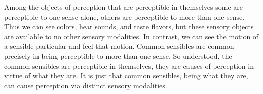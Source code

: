 Among the objects of perception that are perceptible in themselves some are perceptible to one sense alone, others are perceptible to more than one sense. Thus we can see colors, hear sounds, and taste flavors, but these sensory objects are available to no other sensory modalities. In contrast, we can see the motion of a sensible particular and feel that motion. Common sensibles are common precisely in being perceptible to more than one sense. So understood, the common sensibles are perceptible in themselves, they are causes of perception in virtue of what they are. It is just that common sensibles, being what they are, can cause perception via distinct sensory modalities.

% 

